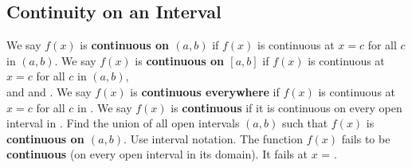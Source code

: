 \documentclass[10pt, addpoints]{exam}
\begin{document}
\begin{questions}
\section{Continuity on an Interval}
We say $f(x)$ is \textbf{continuous on \boldmath $(a,b)$}
	if $f(x)$ is continuous at $x=c$ for all $c$ in $(a,b)$.
\question We say $f(x)$ is \textbf{continuous on \boldmath $[a,b]$}
	if $f(x)$ is continuous at $x=c$ for all $c$ in $(a,b)$, \\[3ex]
	and \fillin[right continuous at $x=a$][3in] and \fillin[left continuous at $x=a$][3in].
\question We say $f(x)$ is \textbf{continuous everywhere}
	if $f(x)$ is continuous at $x=c$ for all $c$ in \fillin[][1in].
\question We say $f(x)$ is \textbf{continuous} if it is continuous on every open interval in \fillin[][2.5in].
\question Find the union of all open intervals $(a,b)$ such that $f(x)$
	is \textbf{continuous on \boldmath $(a,b)$}. Use interval notation.
\question The function $f(x)$ fails to be \textbf{continuous} (on every open interval in its domain). 
	It fails at $x$ = \fillin[][1.4in].

\end{questions}
\end{document}
